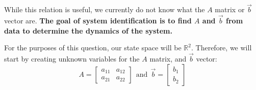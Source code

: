 While this relation is useful, we currently do not know what the $A$ matrix or $\vec{b}$ vector are. \textbf{The goal of system identification is to find $A$ and $\vec{b}$ from data to determine the dynamics of the system.}

For the purposes of this question, our state space will be $\mathbb{R}^2.$ \vskip 1pt
Therefore, we will start by creating unknown variables for the $A$ matrix, and $\vec{b}$ vector:
\begin{equation}
A = \begin{bmatrix} a_{11} & a_{12} \\ a_{21} & a_{22} \end{bmatrix} \ \ \text{and} \ \ \vec{b} = \begin{bmatrix} b_{1} \\ b_{2} \end{bmatrix}
\end{equation}

